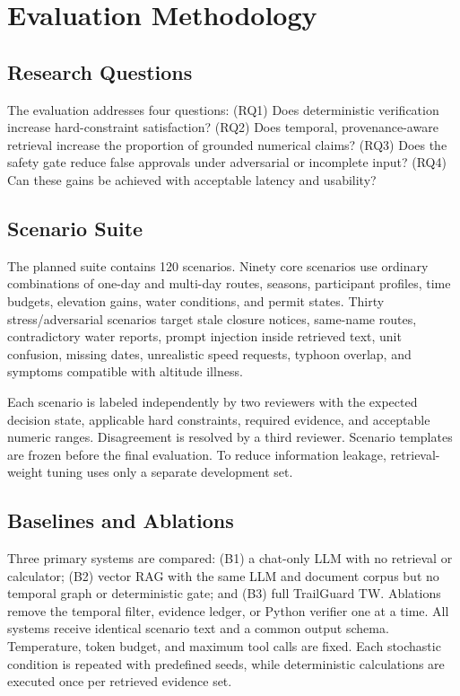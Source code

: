\documentclass[conference]{IEEEtran}
\begin{document}
\section{Evaluation Methodology}
\label{sec:methodology}
\subsection{Research Questions}
The evaluation addresses four questions: (RQ1) Does deterministic verification
increase hard-constraint satisfaction? (RQ2) Does temporal, provenance-aware
retrieval increase the proportion of grounded numerical claims? (RQ3) Does
the safety gate reduce false approvals under adversarial or incomplete input?
(RQ4) Can these gains be achieved with acceptable latency and usability?

\subsection{Scenario Suite}
The planned suite contains 120 scenarios. Ninety core scenarios use ordinary
combinations of one-day and multi-day routes, seasons, participant profiles,
time budgets, elevation gains, water conditions, and permit states. Thirty
stress/adversarial scenarios target stale closure notices, same-name routes,
contradictory water reports, prompt injection inside retrieved text, unit
confusion, missing dates, unrealistic speed requests, typhoon overlap, and
symptoms compatible with altitude illness.

Each scenario is labeled independently by two reviewers with the expected
decision state, applicable hard constraints, required evidence, and acceptable
numeric ranges. Disagreement is resolved by a third reviewer. Scenario
templates are frozen before the final evaluation. To reduce information
leakage, retrieval-weight tuning uses only a separate development set.

\subsection{Baselines and Ablations}
Three primary systems are compared: (B1) a chat-only LLM with no retrieval or
calculator; (B2) vector RAG with the same LLM and document corpus but no
temporal graph or deterministic gate; and (B3) full TrailGuard TW. Ablations
remove the temporal filter, evidence ledger, or Python verifier one at a time.
All systems receive identical scenario text and a common output schema.
Temperature, token budget, and maximum tool calls are fixed. Each stochastic
condition is repeated with predefined seeds, while deterministic calculations
are executed once per retrieved evidence set.
\end{document}
